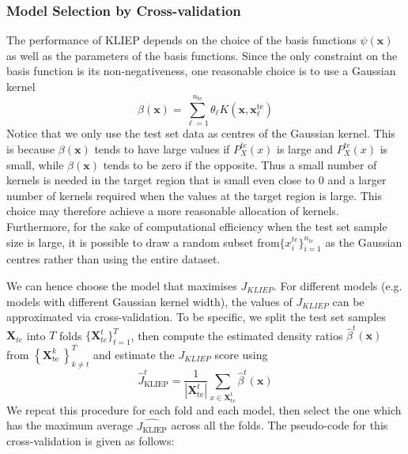 \documentclass[a4paper,12pt]{article}
\begin{document}
\subsubsection{Model Selection by Cross-validation}
The performance of KLIEP depends on the choice of the basis functions $\psi(\boldsymbol{x})$ as well as the parameters of the basis functions. Since the only constraint on the basis function is its non-negativeness, one reasonable choice is to use a Gaussian kernel 
\begin{equation*}
\beta(\boldsymbol{x})=\sum_{\ell=1}^{n_{\mathrm{te}}} \theta_{\ell} K\left(\boldsymbol{x}, \boldsymbol{x}_{\ell}^{\mathrm{te}}\right)
\end{equation*}
Notice that we only use the test set data as centres of the Gaussian kernel. This is because $\beta(\boldsymbol{x})$ tends to have large values if $P_{X}^{te}(x)$ is large and $P^{te}_{X}(x)$ is small, while $\beta(\boldsymbol{x})$ tends to be zero if the opposite. Thus a small number of kernels is needed in the target region that is small even close to 0 and a larger number of kernels required when the values at the target region is large. This choice may therefore achieve a more reasonable allocation of kernels. Furthermore, for the sake of computational efficiency when the test set sample size is large, it is possible to draw a random subset from$\{x_{i}^{te}\}_{i=1}^{n_{te}}$ as the Gaussian centres rather than using the entire dataset.

We can hence choose the model that maximises $J_{KLIEP}$. For different models (e.g. models with different Gaussian kernel width), the values of $J_{KLIEP}$ can be approximated via cross-validation. To be specific, we split the test set samples $\boldsymbol{X}_{te}$ into $T$ folds $\{\boldsymbol{X}_{te}^{t}\}_{t = 1}^{T}$, then compute the estimated density ratios $\hat{\beta}^{t}(\boldsymbol{x})$ from $\left\{\boldsymbol{X}_{\text {te }}^{k}\right\}_{k \neq t}^{T}$ and estimate the $J_{KLIEP}$ score using
\begin{equation*}
\hat{J}_{\mathrm{KLIEP}}^{t}=\frac{1}{\left|\boldsymbol{X}_{\mathrm{te}}^{t}\right|} \sum_{x \in \boldsymbol{X}_{\mathrm{te}}^{\mathrm{t}}} \hat{\beta}^{t}(\boldsymbol{x})
\end{equation*}
We repeat this procedure for each fold and each model, then select the one which has the maximum average $\widehat{J_{\mathrm{KLIEP}}}$ across all the folds. The pseudo-code for this cross-validation is given as follows:
\end{document}
